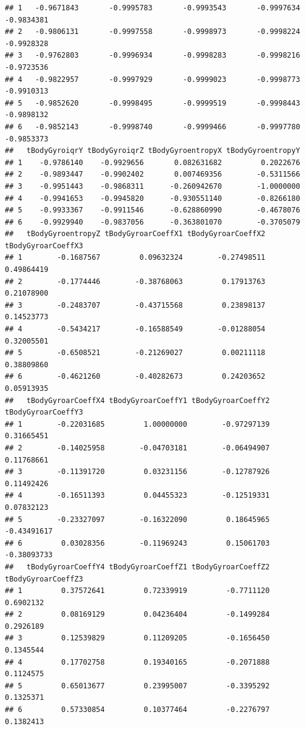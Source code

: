 \documentclass[
]{article}
\begin{document}
\begin{verbatim}
## 1   -0.9671843       -0.9995783       -0.9993543       -0.9997634    -0.9834381
## 2   -0.9806131       -0.9997558       -0.9998973       -0.9998224    -0.9928328
## 3   -0.9762803       -0.9996934       -0.9998283       -0.9998216    -0.9723536
## 4   -0.9822957       -0.9997929       -0.9999023       -0.9998773    -0.9910313
## 5   -0.9852620       -0.9998495       -0.9999519       -0.9998443    -0.9898132
## 6   -0.9852143       -0.9998740       -0.9999466       -0.9997780    -0.9853373
##   tBodyGyroiqrY tBodyGyroiqrZ tBodyGyroentropyX tBodyGyroentropyY
## 1    -0.9786140    -0.9929656       0.082631682         0.2022676
## 2    -0.9893447    -0.9902402       0.007469356        -0.5311566
## 3    -0.9951443    -0.9868311      -0.260942670        -1.0000000
## 4    -0.9941653    -0.9945820      -0.930551140        -0.8266180
## 5    -0.9933367    -0.9911546      -0.628860990        -0.4678076
## 6    -0.9929940    -0.9837056      -0.363801070        -0.3705079
##   tBodyGyroentropyZ tBodyGyroarCoeffX1 tBodyGyroarCoeffX2 tBodyGyroarCoeffX3
## 1        -0.1687567         0.09632324        -0.27498511         0.49864419
## 2        -0.1774446        -0.38768063         0.17913763         0.21078900
## 3        -0.2483707        -0.43715568         0.23898137         0.14523773
## 4        -0.5434217        -0.16588549        -0.01288054         0.32005501
## 5        -0.6508521        -0.21269027         0.00211118         0.38809860
## 6        -0.4621260        -0.40282673         0.24203652         0.05913935
##   tBodyGyroarCoeffX4 tBodyGyroarCoeffY1 tBodyGyroarCoeffY2 tBodyGyroarCoeffY3
## 1        -0.22031685         1.00000000        -0.97297139         0.31665451
## 2        -0.14025958        -0.04703181        -0.06494907         0.11768661
## 3        -0.11391720         0.03231156        -0.12787926         0.11492426
## 4        -0.16511393         0.04455323        -0.12519331         0.07832123
## 5        -0.23327097        -0.16322090         0.18645965        -0.43491617
## 6         0.03028356        -0.11969243         0.15061703        -0.38093733
##   tBodyGyroarCoeffY4 tBodyGyroarCoeffZ1 tBodyGyroarCoeffZ2 tBodyGyroarCoeffZ3
## 1         0.37572641         0.72339919         -0.7711120          0.6902132
## 2         0.08169129         0.04236404         -0.1499284          0.2926189
## 3         0.12539829         0.11209205         -0.1656450          0.1345544
## 4         0.17702758         0.19340165         -0.2071888          0.1124575
## 5         0.65013677         0.23995007         -0.3395292          0.1325371
## 6         0.57330854         0.10377464         -0.2276797          0.1382413

\end{verbatim}
\end{document}
